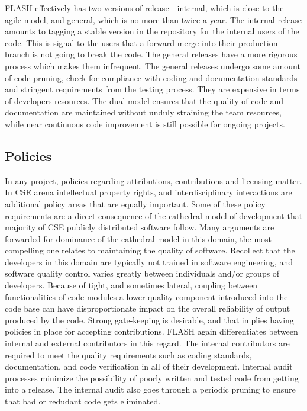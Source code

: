 FLASH effectively has two versions of release - internal, which
is close to the agile model, and general, which is no more than twice
a year. The internal release amounts to tagging a stable version in
the repository for the internal users of the code. This is signal to
the users that a forward merge into their production branch is not
going to break the code. The general releases have a more rigorous
process which makes them infrequent. The general releases undergo some
amount of code pruning, check for compliance with coding and
documentation standards and stringent requirements from the testing
process. They are expensive in terms of developers resources. The
dual model ensures that the quality of code and documentation are
maintained without unduly straining the team resources, while
near continuous code improvement is still possible for ongoing
projects. 
 
\subsection{Policies}
\label{sec:FLASHPolicies}
In any project, policies regarding attributions, contributions and
licensing matter. In CSE arena intellectual property rights,
and interdisciplinary interactions are additional policy
areas that are equally important. Some of these policy requirements
are a direct consequence of the cathedral model \cite{} of development that
majority of CSE publicly distributed software follow.  Many arguments
are forwarded for dominance of the cathedral model in this domain, the
most compelling one relates to maintaining the quality of
software. Recollect that the developers in this domain are typically
not trained in software engineering, and software quality control
varies greatly between individuals and/or groups of
developers. Because of tight, and sometimes lateral, coupling between
functionalities of code modules a lower quality component introduced
into the code base can have disproportionate impact on the overall
reliability of output produced by the code. Strong gate-keeping is
desirable, and that implies having policies in place for accepting
contributions. FLASH again differentiates between internal and
external contributors in this regard. The internal contributors are
required to meet the quality requirements such as coding standards,
documentation, and code verification in all of their
development. Internal audit processes minimize the possibility of
poorly written and tested code from getting into a release. The internal audit also goes
through a periodic pruning to ensure that bad or redudant code gets
eliminated.  

